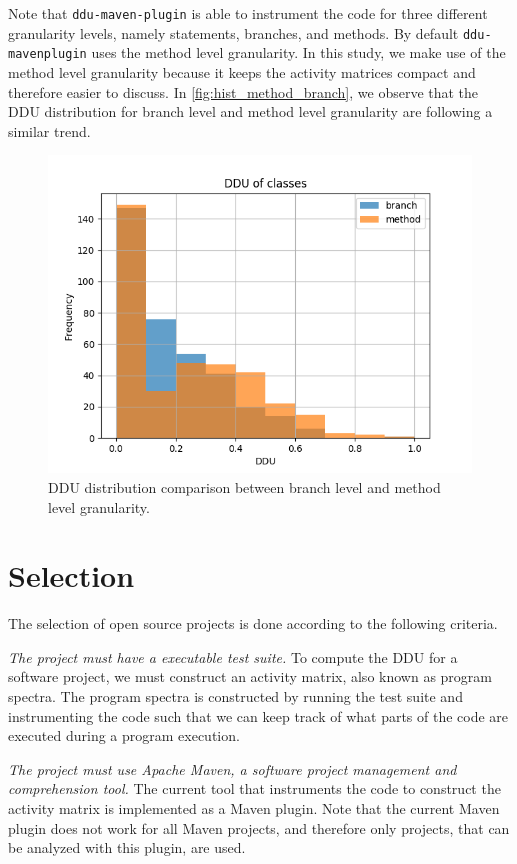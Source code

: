 Note that \texttt{ddu-maven-plugin} is able to instrument the code for three different granularity levels, namely statements, branches, and methods.
By default \texttt{ddu-maven\-plugin} uses the method level granularity.
In this study, we make use of the method level granularity because it keeps the activity matrices compact and therefore easier to discuss.
In \autoref{fig:hist_method_branch}, we observe that the DDU distribution for branch level and method level granularity are following a similar trend.

\begin{figure}
    \centering
    \includegraphics[width=\linewidth]{figures/histogram_ddu_method_branch}
    \caption{DDU distribution comparison between branch level and method level granularity.}
    \label{fig:hist_method_branch}
\end{figure}


\section{Selection}

The selection of open source projects is done according to the following criteria.

\emph{The project must have a executable test suite.}
To compute the DDU for a software project, we must construct an activity matrix, also known as program spectra.
The program spectra is constructed by running the test suite and instrumenting the code such that we can keep track of what parts of the code are executed during a program execution.

\emph{The project must use Apache Maven, a software project management and comprehension tool.}
The current tool that instruments the code to construct the activity matrix is implemented as a Maven plugin. Note that the current Maven plugin does not work for all Maven projects, and therefore only projects, that can be analyzed with this plugin, are used.

